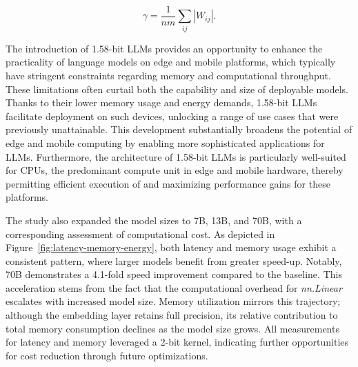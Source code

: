 \begin{equation}
    \gamma = \frac{1}{nm}\sum_{ij} |W_{ij}|.
\end{equation}


\begin{abstract}
The latest advances, exemplified by BitNet~\cite{bitnet}, are ushering in a new generation of 1-bit Large Language Models (LLMs). In this study, we present a novel 1-bit LLM called \textbf{}, which is characterized by ternary parameters \{-1, 0, 1\} for all weights. Remarkably, BitNet b1.58 attains parity with full-precision (FP16 or BF16) Transformer LLMs of comparable size and token count regarding both perplexity and downstream performance, while offering substantial gains in efficiency—drastically reducing latency, memory usage, computational throughput, and energy demand. Perhaps most significantly, our 1.58-bit LLM establishes a fresh scaling law and provides new guidelines for training future LLMs that do not compromise on performance while delivering considerable efficiency. In addition, it supports the development of novel computational paradigms and lays the groundwork for specialized hardware tailored to 1-bit LLMs.
\end{abstract}

The introduction of 1.58-bit LLMs provides an opportunity to enhance the practicality of language models on edge and mobile platforms, which typically have stringent constraints regarding memory and computational throughput. These limitations often curtail both the capability and size of deployable models. Thanks to their lower memory usage and energy demands, 1.58-bit LLMs facilitate deployment on such devices, unlocking a range of use cases that were previously unattainable. This development substantially broadens the potential of edge and mobile computing by enabling more sophisticated applications for LLMs. Furthermore, the architecture of 1.58-bit LLMs is particularly well-suited for CPUs, the predominant compute unit in edge and mobile hardware, thereby permitting efficient execution of  and maximizing performance gains for these platforms.

The study also expanded the model sizes to 7B, 13B, and 70B, with a corresponding assessment of computational cost. As depicted in Figure~\ref{fig:latency-memory-energy}, both latency and memory usage exhibit a consistent pattern, where larger models benefit from greater speed-up. Notably,  70B demonstrates a 4.1-fold speed improvement compared to the  baseline. This acceleration stems from the fact that the computational overhead for \emph{nn.Linear} escalates with increased model size. Memory utilization mirrors this trajectory; although the embedding layer retains full precision, its relative contribution to total memory consumption declines as the model size grows. All measurements for latency and memory leveraged a 2-bit kernel, indicating further opportunities for cost reduction through future optimizations.

